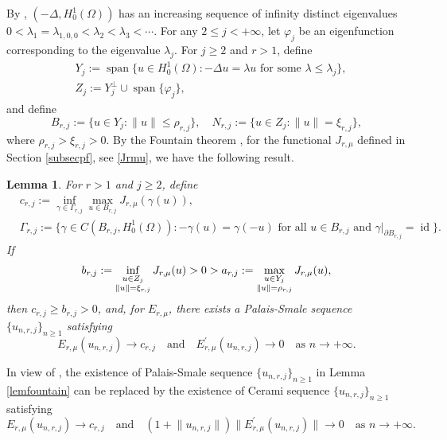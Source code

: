 \documentclass[11pt]{amsart}
\newtheorem{lemma}[theorem]{Lemma}
\newcommand{\norm}[1]{\lVert#1\rVert}
\numberwithin{equation}{section}
\begin{document}
By \cite[Theorem 1 in Section 6.5]{evans}, $(-\Delta,H^{1}_0(\Omega))$ has an increasing sequence of infinity distinct eigenvalues $0<\lambda_1=\lambda_{1,0,0}<\lambda_{2}<\lambda_{3}<\cdots$. For any $2 \leq j <+\infty$, let $\varphi_j$ be an eigenfunction corresponding to the eigenvalue $\lambda_{j}$.
For $j \geq 2$ and $r>1$, define
$$
\begin{aligned}
    &Y_j:=\operatorname{span}\{u \in H^1_0(\Omega):-\Delta u=\lambda u \text{ for some }\lambda \leq \lambda_{j}\},\\
    & Z_j:=Y_j^\perp\cup\operatorname{span}\{\varphi_j\},
\end{aligned}
$$
and define
$$
B_{r,j}:=\{u\in Y_j  : \norm{u}\leq \rho_{r,j}\}, \quad N_{r,j}:=\{u\in Z_j : \norm{u}= \xi_{r,j}\},
$$
where $\rho_{r,j}>\xi_{r,j}>0$.  By the Fountain theorem \cite[Theorem 3.5]{W}, for the functional $J_{r,\mu}$ defined in Section \ref{subsecpf}, see \eqref{Jrmu}, we have the following result.
\begin{lemma}
    For $r>1$ and $j \geq 2$, define
    \begin{equation*}\begin{aligned}
&c_{r,j} := \inf_{\gamma \in \Gamma_{r,j}} \max_{u \in B_{r,j}} J_{r,\mu}(\gamma(u)),\\
&\Gamma_{r,j} := \{\gamma \in C(B_{r,j}, H^1_0(\Omega)) : -\gamma(u)=\gamma(-u) \text{ for all } u \in B_{r,j}\text{ and } \gamma\left.\right|_{\partial B_{r,j}} = \operatorname{id}\}.
    \end{aligned}
\end{equation*}
If
$$
b_{r,j} := \inf_{\begin{subarray}{c} u \in Z_j \\ \norm{u}= \xi_{r,j}\end{subarray}} J_{r,\mu}(u) > 0 > a_{r,j} := \max_{\begin{subarray}{c} u \in Y_j \\ \norm{u} = \rho_{r,j} \end{subarray}} J_{r,\mu}(u),
$$
 then \( c_{r,j} \geq b_{r,j} >0 \), and, for $E_{r, \mu}$, there exists a Palais-Smale sequence $\{u_{n,r,j}\}_{n\geq 1}$ satisfying
\begin{equation*}
 E_{r, \mu}(u_{n,r,j}) \rightarrow c_{r,j} \quad \text{and} \quad E_{r, \mu}^{\prime}(u_{n,r,j}) \rightarrow 0 \quad\text{as }n \to +\infty.
\end{equation*}
\end{lemma}
In view of \cite{Bar,Ce}, the existence of Palais-Smale sequence $\{u_{n,r,j}\}_{n\geq1}$ in Lemma \ref{lemfountain} can be replaced by the existence of Cerami sequence $\{u_{n,r,j}\}_{n\geq1}$ satisfying
\begin{equation*}
 E_{r, \mu}(u_{n,r,j}) \rightarrow c_{r,j}\quad \text{and} \quad (1+\norm{u_{n,r,j}})\norm{E_{r, \mu}^{\prime}(u_{n,r,j})} \rightarrow 0 \quad\text{as }n \to +\infty.
\end{equation*}
\end{document}
